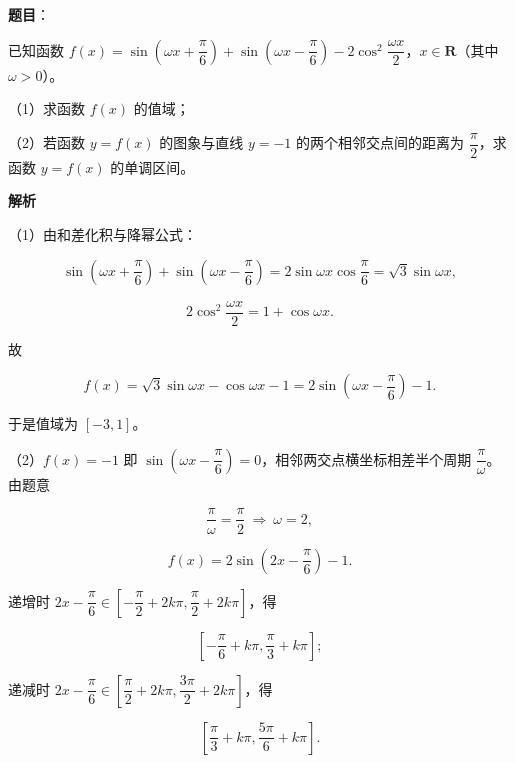 \begin{answer}

\textbf{题目}：

已知函数 $f(x)=\sin\left(\omega x+\dfrac{\pi}{6}\right)+\sin\left(\omega x-\dfrac{\pi}{6}\right)-2\cos^2\dfrac{\omega x}{2}$，$x\in\mathbf R$（其中 $\omega>0$）。

（1）求函数 $f(x)$ 的值域；

（2）若函数 $y=f(x)$ 的图象与直线 $y=-1$ 的两个相邻交点间的距离为 $\dfrac{\pi}{2}$，求函数 $y=f(x)$ 的单调区间。

\textbf{解析}

（1）由和差化积与降幂公式：

\nopagebreak[4]
\[\sin\left(\omega x+\frac{\pi}6\right)+\sin\left(\omega x-\frac{\pi}6\right)=2\sin\omega x\cos\frac{\pi}6=\sqrt3\sin\omega x,\]

\nopagebreak[4]
\[2\cos^2\frac{\omega x}2=1+\cos\omega x.\]

故

\nopagebreak[4]
\[f(x)=\sqrt3\sin\omega x-\cos\omega x-1=2\sin\left(\omega x-\frac{\pi}6\right)-1.\]

于是值域为 $[-3,1]$。

（2）$f(x)=-1$ 即 $\sin\left(\omega x-\dfrac{\pi}6\right)=0$，相邻两交点横坐标相差半个周期 $\dfrac{\pi}\omega$。由题意

\nopagebreak[4]
\[\frac{\pi}\omega=\frac{\pi}2\ \Rightarrow\ \omega=2,\]

\nopagebreak[4]
\[f(x)=2\sin\left(2x-\frac{\pi}6\right)-1.\]

递增时 $2x-\dfrac{\pi}6\in\left[-\dfrac{\pi}2+2k\pi,\dfrac{\pi}2+2k\pi\right]$，得

\nopagebreak[4]
\[\left[-\frac{\pi}6+k\pi,\frac{\pi}3+k\pi\right];\]

递减时 $2x-\dfrac{\pi}6\in\left[\dfrac{\pi}2+2k\pi,\dfrac{3\pi}2+2k\pi\right]$，得

\nopagebreak[4]
\[\left[\frac{\pi}3+k\pi,\frac{5\pi}6+k\pi\right].\]


\end{answer}
